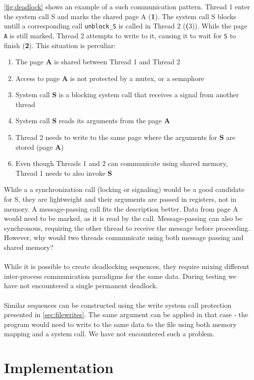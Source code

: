 \cref{fig:deadlock} shows an example of a such communication pattern. Thread 1 enter the system call S and marks the shared page A (\textbf{1}).
The system call S blocks untill a corresponding call \texttt{unblock\_S} is called in Thread 2 (\textbf(3)). While the page \texttt{A} is still marked, Thread 2
attempts to write to it, causing it to wait for \texttt{S} to finish (\textbf{2}).
This situation is perculiar:
\begin{enumerate}
    \item The page \textbf{A} is shared between Thread 1 and Thread 2
    \item Access to page \textbf{A} is not protected by a mutex, or a semaphore
    \item System call \textbf{S} is a blocking system call that receives a signal from another thread
    \item System call \textbf{S} reads its arguments from the page \textbf{A}
    \item Thread 2 needs to write to the same page where the arguments for \textbf{S} are stored (page \textbf{A})
    \item Even though Threads 1 and 2 can communicate using shared memory, Thread 1 needs to also invoke \textbf{S}
\end{enumerate}

While a a synchronization call (locking or signaling) would be a good candidate for S, they are lightweight and their arguments
are passed in registers, not in memory. A message-passing call fits the description better. Data from page A would need to be marked,
as it is read by the call. Message-passing can also be synchronous, requiring the other thread to receive the message before proceeding.
However, why would two threads communicate using both message passing and shared memory?
\\
\\
While it is possible to create deadlocking sequences, they require mixing different inter-process communication
paradigms for the same data. During testing we have not encountered a single permanent deadlock.
\\
\\
Similar sequences can be constructed using the write system call protection presented in \cref{sec:filewrites}. The same argument
can be applied in that case - the program would need to write to the same data to the file using both memory mapping and a system call. We
have not encountered such a problem.


\section{Implementation}
\label{sec:implementation}


